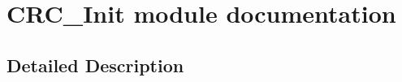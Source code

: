 \hypertarget{group___c_r_c___init__module}{}\section{C\+R\+C\+\_\+\+Init module documentation}
\label{group___c_r_c___init__module}


\subsection{Detailed Description}
